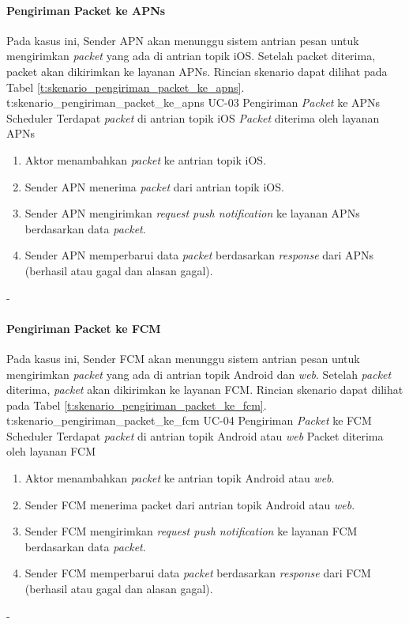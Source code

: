 \paragraph{Pengiriman Packet ke APNs}
\par Pada kasus ini, Sender APN akan menunggu sistem antrian pesan untuk mengirimkan \textit{packet} yang ada di antrian topik iOS. Setelah packet diterima, packet akan dikirimkan ke layanan APNs. Rincian skenario dapat dilihat pada Tabel \ref{t:skenario_pengiriman_packet_ke_apns}.
\tableUcDesc
{t:skenario_pengiriman_packet_ke_apns}
{UC-03}
{Pengiriman \textit{Packet} ke APNs}
{Scheduler}
{Terdapat \textit{packet} di antrian topik iOS}
{\textit{Packet} diterima oleh layanan APNs}
{
\begin{enumerate}
	\item Aktor menambahkan \textit{packet} ke antrian topik iOS.
    \item Sender APN menerima \textit{packet} dari antrian topik iOS.
    \item Sender APN mengirimkan \textit{request push notification} ke layanan APNs berdasarkan data \textit{packet}.
    \item Sender APN memperbarui data \textit{packet} berdasarkan \textit{response} dari APNs (berhasil atau gagal dan alasan gagal).
\end{enumerate}
}
{-}

\paragraph{Pengiriman Packet ke FCM}
\par Pada kasus ini, Sender FCM akan menunggu sistem antrian pesan untuk mengirimkan \textit{packet} yang ada di antrian topik Android dan \textit{web}. Setelah \textit{packet} diterima, \textit{packet} akan dikirimkan ke layanan FCM. Rincian skenario dapat dilihat pada Tabel \ref{t:skenario_pengiriman_packet_ke_fcm}.
\tableUcDesc
{t:skenario_pengiriman_packet_ke_fcm}
{UC-04}
{Pengiriman \textit{Packet} ke FCM}
{Scheduler}
{Terdapat \textit{packet} di antrian topik Android atau \textit{web}}
{Packet diterima oleh layanan FCM}
{
\begin{enumerate}
	\item Aktor menambahkan \textit{packet} ke antrian topik Android atau \textit{web}.
    \item Sender FCM menerima packet dari antrian topik Android atau \textit{web}.
    \item Sender FCM mengirimkan \textit{request push notification} ke layanan FCM berdasarkan data \textit{packet}.
    \item Sender FCM memperbarui data \textit{packet} berdasarkan \textit{response} dari FCM (berhasil atau gagal dan alasan gagal).
\end{enumerate}
}
{-}

